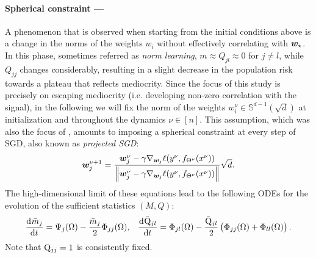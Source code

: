 \paragraph{Spherical constraint ---} A phenomenon that is observed when starting from the initial conditions above is a change in the norms of the weights $w_{i}$ without effectively correlating with ${\boldsymbol{w}}_\star$. In this phase, sometimes referred as \emph{norm learning}, $m\approx Q_{jl} \approx 0$ for $j\neq l$, while $Q_{jj}$ changes considerably, resulting in a slight decrease in the population risk towards a plateau that reflects mediocrity. Since the focus of this study is precisely on escaping mediocrity (i.e. developing non-zero correlation with the signal), in the following we will fix the norm of the weights $w^{\nu}_{i}\in\mathbb{S}^{d-1}(\sqrt{d})$ at initialization and throughout the dynamics $\nu\in[n]$. This assumption, which was also the focus of \cite{arous2021online}, amounts to imposing a spherical constraint at every step of SGD, also known as \emph{projected SGD}:
\begin{equation}
    {\boldsymbol{w}}_j^{\nu+1} = \frac{{\boldsymbol{w}}_j^{\nu}-\gamma\nabla_{{\boldsymbol{w}}_j}\ell(y^{\nu},f_{\Theta^{\nu}}(x^{\nu}))}{\left\lVert{\boldsymbol{w}}_j^{\nu}-\gamma\nabla_{{\boldsymbol{w}}_j}\ell(y^{\nu},f_{\Theta^{\nu}}(x^{\nu}))\right\rVert}\sqrt{d}.
\end{equation}
The high-dimensional limit of these equations lead to the following ODEs for the evolution of the sufficient statistics $(M, Q)$: 
\begin{align}\label{2305:eq:overlapping_spherical_ODE}
    \dod{\bar{m}_j}{t} = \Psi_{j}{(\Omega)} - \frac{\bar{m}_j}{2}\Phi_{jj}{(\Omega)}, &&
    \dod{\bar{\Q}_{jl}}{t} = \Phi_{jl}{(\Omega)} - \frac{\bar{\Q}_{jl}}{2}\left(\Phi_{jj}{(\Omega)}+\Phi_{ll}{(\Omega)}\right).
\end{align}
Note that \(\mathrm{Q}_{jj}=1\) is consistently fixed. 
